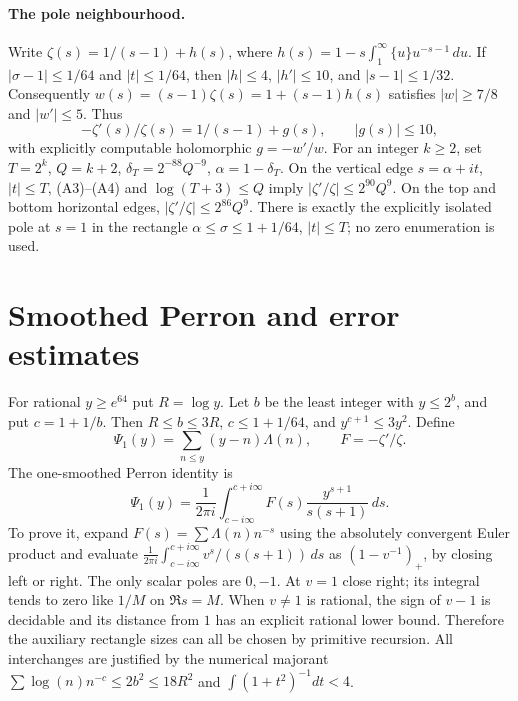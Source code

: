 \paragraph{The pole neighbourhood.}
Write $\zeta(s)=1/(s-1)+h(s)$, where
$h(s)=1-s\int_1^\infty\{u\}u^{-s-1}\,du$.
If $|\sigma-1|\le1/64$ and $|t|\le1/64$, then $|h|\le4$, $|h'|\le10$,
and $|s-1|\le1/32$. Consequently
$w(s)=(s-1)\zeta(s)=1+(s-1)h(s)$ satisfies $|w|\ge7/8$ and
$|w'|\le5$. Thus
\[
 -\zeta'(s)/\zeta(s)=1/(s-1)+g(s),\qquad |g(s)|\le10,            \tag{A4}
\]
with explicitly computable holomorphic $g=-w'/w$.
For an integer $k\ge2$, set $T=2^k$, $Q=k+2$, $\delta_T=2^{-88}Q^{-9}$,
$\alpha=1-\delta_T$. On the vertical edge $s=\alpha+it$, $|t|\le T$,
(A3)--(A4) and $\log(T+3)\le Q$ imply $|\zeta'/\zeta|\le2^{90}Q^9$.
On the top and bottom horizontal edges, $|\zeta'/\zeta|\le2^{86}Q^9$.
There is exactly the explicitly isolated pole at $s=1$ in the rectangle
$\alpha\le\sigma\le1+1/64$, $|t|\le T$; no zero enumeration is used.

\section{Smoothed Perron and error estimates}
For rational $y\ge e^{64}$ put $R=\log y$. Let $b$ be the least integer
with $y\le2^b$, and put $c=1+1/b$. Then $R\le b\le3R$,
$c\le1+1/64$, and $y^{c+1}\le3y^2$. Define
\[
 \Psi_1(y)=\sum_{n\le y}(y-n)\Lambda(n),\qquad F=-\zeta'/\zeta.
\]
The one-smoothed Perron identity is
\[
 \Psi_1(y)=\frac1{2\pi i}\int_{c-i\infty}^{c+i\infty}
 F(s)\frac{y^{s+1}}{s(s+1)}\,ds.                              \tag{A5}
\]
To prove it, expand $F(s)=\sum\Lambda(n)n^{-s}$ using the absolutely
convergent Euler product and evaluate
$\frac1{2\pi i}\int_{c-i\infty}^{c+i\infty}v^s/(s(s+1))\,ds$
as $(1-v^{-1})_+$, by closing left or right. The only scalar poles are
$0,-1$. At $v=1$ close right; its integral tends to zero like $1/M$ on
$\Re s=M$. When $v\ne1$ is rational, the sign of $v-1$ is decidable and
its distance from $1$ has an explicit rational lower bound. Therefore the
auxiliary rectangle sizes can all be chosen by primitive recursion.
All interchanges are justified by the numerical majorant
$\sum\log(n)n^{-c}\le2b^2\le18R^2$ and $\int(1+t^2)^{-1}dt<4$.

